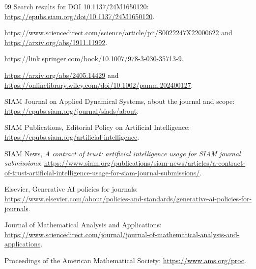 \documentclass[11pt]{amsart}
\begin{document}
\begin{thebibliography}{99}
Search results for DOI 10.1137/24M1650120: \url{https://epubs.siam.org/doi/10.1137/24M1650120}.

\url{https://www.sciencedirect.com/science/article/pii/S0022247X22000622} and \url{https://arxiv.org/abs/1911.11992}.

\url{https://link.springer.com/book/10.1007/978-3-030-35713-9}.

\url{https://arxiv.org/abs/2405.14429} and \url{https://onlinelibrary.wiley.com/doi/10.1002/pamm.202400127}.

SIAM Journal on Applied Dynamical Systems, about the journal and scope:
\url{https://epubs.siam.org/journal/siads/about}.

SIAM Publications, Editorial Policy on Artificial Intelligence: \url{https://epubs.siam.org/artificial-intelligence}.

SIAM News, \emph{A contract of trust: artificial intelligence usage for SIAM journal submissions}:
\url{https://www.siam.org/publications/siam-news/articles/a-contract-of-trust-artificial-intelligence-usage-for-siam-journal-submissions/}.

Elsevier, Generative AI policies for journals:
\url{https://www.elsevier.com/about/policies-and-standards/generative-ai-policies-for-journals}.

Journal of Mathematical Analysis and Applications:
\url{https://www.sciencedirect.com/journal/journal-of-mathematical-analysis-and-applications}.

Proceedings of the American Mathematical Society: \url{https://www.ams.org/proc}.

\end{thebibliography}
\end{document}
